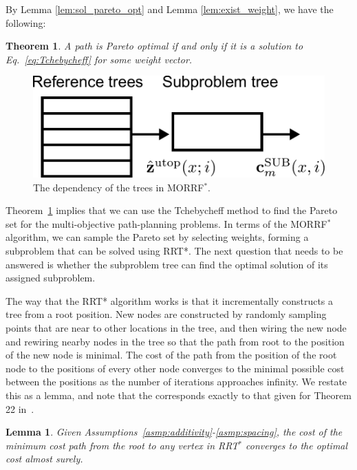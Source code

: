 \documentclass{article}
\newtheorem{thm}{Theorem}
\newtheorem{lem}{Lemma}
\begin{document}
By Lemma \ref{lem:sol_pareto_opt} and Lemma \ref{lem:exist_weight}, we have the following:

\begin{thm}
\label{thm:moo-d:rrt}
A path is Pareto optimal if and only if it is a solution to Eq.~\eqref{eq:Tchebycheff} for some weight vector.
\end{thm}

\begin{figure}
\centering
\includegraphics[width=0.7\linewidth]{fig/cascade}
\caption{The dependency of the trees in MORRF$^{*}$.}
\label{fig:dependency}
\end{figure}

Theorem~\ref{thm:moo-d:rrt} implies that we can use the Tchebycheff method to find the Pareto set for the multi-objective path-planning problems.  
In terms of the MORRF$^{*}$ algorithm, we can sample the Pareto set by selecting weights, forming a subproblem that can be solved using RRT*. 
The next question that needs to be answered is whether the subproblem tree can find the optimal solution of its assigned subproblem.


The way that the RRT* algorithm works is that it incrementally constructs a tree from a root position.  New nodes are constructed by randomly sampling points that are near to other locations in the tree, and then wiring the new node and rewiring nearby nodes in the tree so that the path from root to the position of the new node is minimal.  The cost of the path from the position of the root node to the positions of every other node converges to the minimal possible cost between the positions as the number of iterations approaches infinity.  We restate this as a lemma, and note that the corresponds exactly to that given for Theorem 22 in~\cite{Karaman.Frazzoli:RSS10}.
\begin{lem}
\label{lem:tree_vex:conv}
Given Assumptions~\ref{asmp:additivity}-\ref{asmp:spacing},
the cost of the minimum cost path from the root to any vertex in RRT$^{*}$ converges to the optimal cost almost surely.
\end{lem}
  
\end{document}
